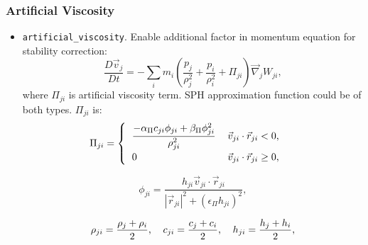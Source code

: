 \subsubsection{Artificial Viscosity}
\begin{itemize}
    \item \verb|artificial_viscosity|. Enable additional factor in momentum equation for stability correction:
    \begin{equation}
        \frac{D\vec{v}_j}{D t} = 
        -\sum\limits_{i} m_{i} 
        \left(
        \frac{p_{j}}{\rho_{j}^{2}} + 
        \frac{p_{i}}{\rho_{i}^{2}} +
        \Pi_{ji}
        \right) \vec{\nabla}_{j} W_{ji},
    \end{equation}
    where $\Pi_{ji}$ is artificial viscosity term. SPH approximation function could be of both types.
    $\Pi_{ji}$ is:
    \begin{equation}\label{eq:artvisc}
        \Pi_{ji} = 
        \begin{cases}
          \begin{tabular}{l l}
              $\displaystyle{
              \frac{-\alpha_{\Pi}c_{ji}\phi_{ji} + \beta_{\Pi}\phi_{ji}^{2}}{\rho_{ji}^{2}}
              }$
              &
              $\vec{v}_{ji} \cdot \vec{r}_{ji} < 0$, 
              
              \\
              
              0
              &
              $\vec{v}_{ji} \cdot \vec{r}_{ji} \geq 0$,
          \end{tabular}  
        \end{cases} 
    \end{equation}

    \begin{equation}
        \phi_{ji} = 
        \frac
        {h_{ji}\vec{v}_{ji} \cdot \vec{r}_{ji}}
        {|\vec{r}_{ji}|^2 + (\epsilon_{\Pi} h_{ji})^2 },
    \end{equation}

    \begin{equation}
        \begin{tabular}{l l l}
              $\displaystyle{
              \rho_{ji} = \frac{\rho_{j} + \rho_{i}}{2}
              }$,
              &
              $\displaystyle{
              c_{ji} = \frac{c_{j} + c_{i}}{2}
              }$, 
              &
              $\displaystyle{
              h_{ji} = \frac{h_{j} + h_{i}}{2}
              }$,
          \end{tabular}  
    \end{equation}
    

\end{itemize}
